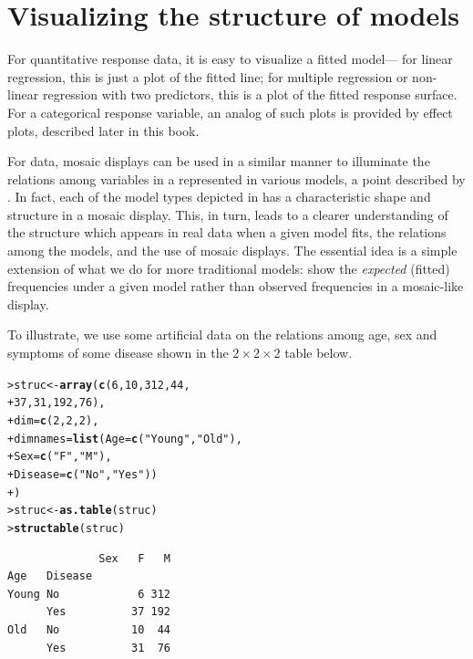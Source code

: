 \documentclass[10pt,krantz2]{krantz}\usepackage[]{graphicx}\usepackage[]{color}
\makeatletter
\newcommand{\hlnum}[1]{\textcolor[rgb]{0.686,0.059,0.569}{#1}}%
\newcommand{\hlstr}[1]{\textcolor[rgb]{0.192,0.494,0.8}{#1}}%
\newcommand{\hlstd}[1]{\textcolor[rgb]{0.345,0.345,0.345}{#1}}%
\newcommand{\hlkwb}[1]{\textcolor[rgb]{0.69,0.353,0.396}{#1}}%
\newcommand{\hlkwc}[1]{\textcolor[rgb]{0.333,0.667,0.333}{#1}}%
\newcommand{\hlkwd}[1]{\textcolor[rgb]{0.737,0.353,0.396}{\textbf{#1}}}%
\newenvironment{kframe}{%
 \def\at@end@of@kframe{}%
 \ifinner\ifhmode%
  \def\at@end@of@kframe{\end{minipage}}%
  \begin{minipage}{\columnwidth}%
 \fi\fi%
 \def\FrameCommand##1{\hskip\@totalleftmargin \hskip-\fboxsep
 \colorbox{shadecolor}{##1}\hskip-\fboxsep
     \hskip-\linewidth \hskip-\@totalleftmargin \hskip\columnwidth}%
 \MakeFramed {\advance\hsize-\width
   \@totalleftmargin\z@ \linewidth\hsize
   \@setminipage}}%
 {\par\unskip\endMakeFramed%
 \at@end@of@kframe}
\newenvironment{knitrout}{}{} %
\renewenvironment{knitrout}{\small\renewcommand{\baselinestretch}{.85}}{} %
\makeatother
\begin{document}
\section{Visualizing the structure of \loglin models}\label{sec:mosaic-struc}
For quantitative response data, it is easy to visualize a fitted model---
for linear regression, this is just a plot of the fitted line;
for multiple regression or non-linear regression with two predictors,
this is a plot of the fitted response surface.  For a categorical
response variable, an analog of such plots is provided by
effect plots, described later in this book.

For \ctab data,
mosaic displays can be used in a similar manner to illuminate the relations among
variables in a \ctab represented in various \loglin{} models,
a point described by \citet{TheusLauer:99}.
In fact,
each of the model types depicted in  has
a characteristic shape and structure in a mosaic display. This,
in turn, leads to a clearer understanding of the structure which appears
in real data when a given model fits, the relations among the models,
and the use of mosaic displays.  The essential idea is a simple
extension of what we do for more traditional models:
show the \emph{expected} (fitted) frequencies under a given model
rather than observed frequencies in a mosaic-like display.

To illustrate, we use some artificial data on the relations among
age, sex and symptoms of some disease shown in the $2 \times 2 \times 2$ table
 below.
\begin{knitrout}
\color{fgcolor}\begin{kframe}
\begin{alltt}
\hlstd{> }\hlstd{struc} \hlkwb{<-} \hlkwd{array}\hlstd{(}\hlkwd{c}\hlstd{(}\hlnum{6}\hlstd{,} \hlnum{10}\hlstd{,} \hlnum{312}\hlstd{,} \hlnum{44}\hlstd{,}
\hlstd{+ }                 \hlnum{37}\hlstd{,} \hlnum{31}\hlstd{,} \hlnum{192}\hlstd{,} \hlnum{76}\hlstd{),}
\hlstd{+ } \hlkwc{dim} \hlstd{=} \hlkwd{c}\hlstd{(}\hlnum{2}\hlstd{,} \hlnum{2}\hlstd{,} \hlnum{2}\hlstd{),}
\hlstd{+ } \hlkwc{dimnames} \hlstd{=} \hlkwd{list}\hlstd{(}\hlkwc{Age} \hlstd{=} \hlkwd{c}\hlstd{(}\hlstr{"Young"}\hlstd{,} \hlstr{"Old"}\hlstd{),}
\hlstd{+ }                 \hlkwc{Sex} \hlstd{=} \hlkwd{c}\hlstd{(}\hlstr{"F"}\hlstd{,} \hlstr{"M"}\hlstd{),}
\hlstd{+ }                 \hlkwc{Disease} \hlstd{=} \hlkwd{c}\hlstd{(}\hlstr{"No"}\hlstd{,} \hlstr{"Yes"}\hlstd{))}
\hlstd{+ } \hlstd{)}
\hlstd{> }\hlstd{struc} \hlkwb{<-} \hlkwd{as.table}\hlstd{(struc)}
\hlstd{> }\hlkwd{structable}\hlstd{(struc)}
\end{alltt}
\begin{verbatim}
              Sex   F   M
Age   Disease            
Young No            6 312
      Yes          37 192
Old   No           10  44
      Yes          31  76
\end{verbatim}
\end{kframe}
\end{knitrout}
\end{document}
